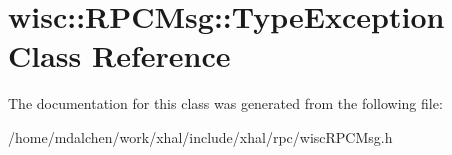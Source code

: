 \hypertarget{classwisc_1_1RPCMsg_1_1TypeException}{
\section{wisc::RPCMsg::TypeException Class Reference}
\label{classwisc_1_1RPCMsg_1_1TypeException}
}


The documentation for this class was generated from the following file:\begin{DoxyCompactItemize}
\item 
/home/mdalchen/work/xhal/include/xhal/rpc/wiscRPCMsg.h\end{DoxyCompactItemize}

